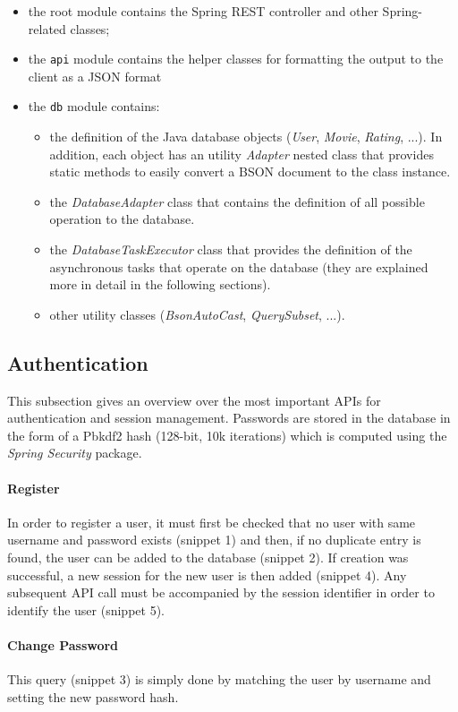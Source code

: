 \documentclass[11pt]{article}
\begin{document}
\begin{itemize}
	\item the root module contains the Spring REST controller and other Spring-related classes;
	\item the \texttt{api} module contains the helper classes for formatting the output to the client as a JSON format
	\item the \texttt{db} module contains:
	\begin{itemize}
		\item the definition of the Java database objects (\emph{User}, \emph{Movie}, \emph{Rating}, ...). In addition, each object has an utility \emph{Adapter} nested class that provides static methods to easily convert a BSON document to the class instance.
		\item the \emph{DatabaseAdapter} class that contains the definition of all possible operation to the database.
		\item the \emph{DatabaseTaskExecutor} class that provides the definition of the asynchronous tasks that operate on the database (they are explained more in detail in the following sections).
		\item other utility classes (\emph{BsonAutoCast}, \emph{QuerySubset}, ...).
	\end{itemize}
\end{itemize}

\subsection{Authentication}
This subsection gives an overview over the most important APIs for authentication and session management. Passwords are stored in the database in the form of a Pbkdf2 hash (128-bit, 10k iterations) which is computed using the \emph{Spring Security} package.

\paragraph{Register}
In order to register a user, it must first be checked that no user with same username and password exists (snippet 1) and then, if no duplicate entry is found, the user can be added to the database (snippet 2). If creation was successful, a new session for the new user is then added (snippet 4). Any subsequent API call must be accompanied by the session identifier in order to identify the user (snippet 5).

\paragraph{Change Password}
This query (snippet 3) is simply done by matching the user by username and setting the new password hash.
\end{document}
